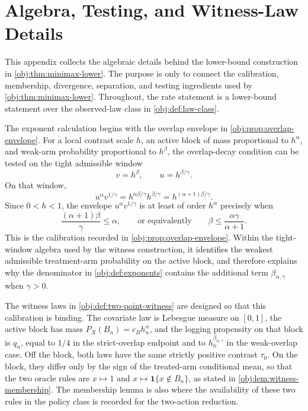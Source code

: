 \section{Algebra, Testing, and Witness-Law Details}

This appendix collects the algebraic details behind the lower-bound construction in \cref{obj:thm:minimax-lower}.  The purpose is only to connect the calibration, membership, divergence, separation, and testing ingredients used by \cref{obj:thm:minimax-lower}.  Throughout, the rate statement is a lower-bound statement over the observed-law class in \cref{obj:def:law-class}.

The exponent calculation begins with the overlap envelope in \cref{obj:prop:overlap-envelope}.  For a local contrast scale \(h\), an active block of mass proportional to \(h^\alpha\), and weak-arm probability proportional to \(h^\beta\), the overlap-decay condition can be tested on the tight admissible window
\[
v=h^\beta,
\qquad
u=h^{\beta/\gamma}.
\]
On that window,
\[
u^\alpha v^{1/\gamma}
=
h^{\alpha\beta/\gamma}h^{\beta/\gamma}
=
h^{(\alpha+1)\beta/\gamma}.
\]
Since \(0<h<1\), the envelope \(u^\alpha v^{1/\gamma}\) is at least of order \(h^\alpha\) precisely when
\[
\frac{(\alpha+1)\beta}{\gamma}\le \alpha,
\qquad\text{or equivalently}\qquad
\beta\le \frac{\alpha\gamma}{\alpha+1}.
\]
This is the calibration recorded in \cref{obj:prop:overlap-envelope}.  Within the tight-window algebra used by the witness construction, it identifies the weakest admissible treatment-arm probability on the active block, and therefore explains why the denominator in \cref{obj:def:exponents} contains the additional term \(\beta_{\alpha,\gamma}\) when \(\gamma>0\).

The witness laws in \cref{obj:def:two-point-witness} are designed so that this calibration is binding.  The covariate law is Lebesgue measure on \([0,1]\), the active block has mass \(P_X(B_n)=c_Bh_n^\alpha\), and the logging propensity on that block is \(q_n\), equal to \(1/4\) in the strict-overlap endpoint and to \(h_n^{\beta_{\alpha,\gamma}}\) in the weak-overlap case.  Off the block, both laws have the same strictly positive contrast \(\tau_0\).  On the block, they differ only by the sign of the treated-arm conditional mean, so that the two oracle rules are \(x\mapsto 1\) and \(x\mapsto \mathbf 1\{x\notin B_n\}\), as stated in \cref{obj:lem:witness-membership}.  The membership lemma is also where the availability of these two rules in the policy class is recorded for the two-action reduction.

